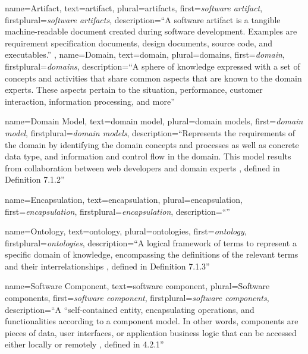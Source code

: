  {
  name=Artifact,
  text=artifact,
  plural=artifacts,
  first={\emph{software artifact}}, 
  firstplural={\emph{software artifacts}}, 
  description={``A software artifact is a tangible machine-readable document created during software development. Examples are requirement specification documents, design documents, source code, and executables.'' \autocite{OMG2016KDM}, \autocite[cf.~\emph{physical asset}][entry 3.261]{ISO/IEEE24765Vocabulary}}
}
 {
  name=Domain,
  text=domain,
  plural=domains,
  first={\emph{domain}}, 
  firstplural={\emph{domains}}, 
  description={``A sphere of knowledge expressed with a set of concepts and activities that share common aspects that are known to the domain experts. These aspects pertain to the situation, performance, customer interaction, information processing, and more'' \autocite{Chemnitz2017}}
}

 {
  name=Domain Model,
  text=domain model,
  plural=domain models,
  first={\emph{domain model}}, 
  firstplural={\emph{domain models}}, 
  description={``Represents the requirements of the domain by identifying the domain concepts and processes as well as concrete data type, and information and control flow in the domain. This model results from collaboration between web developers and domain experts \autocite{Chemnitz2017}, defined in Definition 7.1.2''}
}


 {
  name=Encapsulation,
  text=encapsulation,
  plural=encapsulation,
  first={\emph{encapsulation}}, 
  firstplural={\emph{encapsulation}}, 
  description={``''}
}

 {
  name=Ontology,
  text=ontology,
  plural=ontologies,
  first={\emph{ontology}}, 
  firstplural={\emph{ontologies}}, 
  description={``A logical framework of terms to represent a specific domain of knowledge, encompassing the definitions of the relevant terms and their interrelationships \autocite{Chemnitz2017}, defined in Definition 7.1.3''}
}

 {
  name=Software Component,
  text=software component,
  plural=Software components,
  first={\emph{software component}}, 
  firstplural={\emph{software components}}, 
  description={``A “self-contained entity, encapsulating operations, and functionalities according to a component model. In other words, components are pieces of data, user interfaces, or application business logic that can be accessed either locally or remotely \autocite{Chemnitz2017}, defined in 4.2.1''}
}

